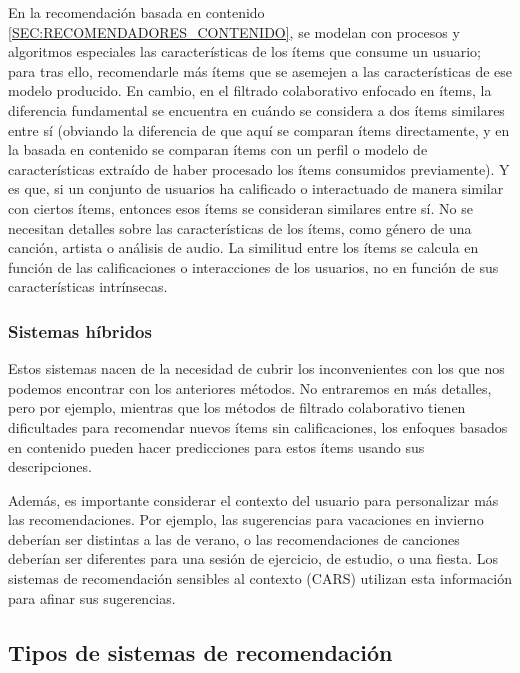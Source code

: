 En la recomendación basada en contenido \ref{SEC:RECOMENDADORES_CONTENIDO}, se modelan con procesos y algoritmos especiales las características de los ítems
 que consume un usuario; para tras ello, recomendarle más ítems que se asemejen a las características de ese modelo producido. En cambio, en el filtrado
  colaborativo enfocado en ítems, la diferencia fundamental se encuentra en cuándo se considera a dos ítems similares entre sí (obviando la diferencia de 
  que aquí se comparan ítems directamente, y en la basada en contenido se comparan ítems con un perfil o modelo de características extraído de haber 
  procesado los ítems consumidos previamente). Y es que, si un conjunto de usuarios ha calificado o interactuado de manera similar con ciertos ítems, 
  entonces esos ítems se consideran similares entre sí. No se necesitan detalles sobre las características de los ítems, como género de una canción, 
  artista o análisis de audio. La similitud entre los ítems se calcula en función de las calificaciones o interacciones de los usuarios, no en función 
  de sus características intrínsecas.


\subsubsection{Sistemas híbridos\label{SEC:RECOMENDADORES_HIBRIDOS}}

Estos sistemas nacen de la necesidad de cubrir los inconvenientes con los que nos podemos encontrar con los anteriores métodos. No entraremos en más detalles,
pero por ejemplo, mientras que los métodos de filtrado colaborativo tienen dificultades para recomendar nuevos ítems sin calificaciones, los enfoques 
basados en contenido pueden hacer predicciones para estos ítems usando sus descripciones.

Además, es importante considerar el contexto del usuario para personalizar más las recomendaciones. Por ejemplo, las sugerencias para vacaciones en 
invierno deberían ser distintas a las de verano, o las recomendaciones de canciones deberían ser diferentes para una sesión de ejercicio, de estudio, o 
una fiesta. Los sistemas de recomendación sensibles al contexto (CARS) \cite{contextrecommender} utilizan esta información para afinar sus sugerencias.




\subsection{Tipos de sistemas de recomendación\label{SEC:TIPOS_RECOMENDADORES}}

